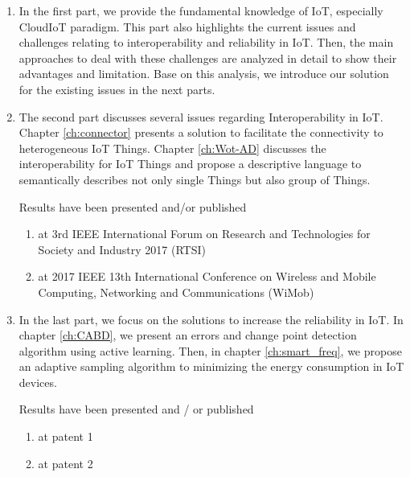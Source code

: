\begin{enumerate}
\item In the first part, we provide the fundamental knowledge of IoT, especially CloudIoT paradigm. This part also highlights the current issues and challenges relating to interoperability and reliability in IoT. Then, the main approaches to deal with these challenges are analyzed in detail to show their advantages and limitation. Base on this analysis, we introduce our solution for the existing issues in the next parts. 

\item The second part discusses several issues regarding Interoperability in IoT. Chapter \ref{ch:connector} presents a solution to facilitate the connectivity to heterogeneous IoT Things. Chapter \ref{ch:Wot-AD} discusses the interoperability for IoT Things and propose a  descriptive language to semantically describes not only single Things but also group of Things.

Results have been presented and/or published
\begin{enumerate}
\item at 3rd IEEE International Forum on Research and Technologies for Society and Industry 2017 (RTSI)~\cite{kim2017industrial}
\item  at 2017 IEEE 13th International Conference on Wireless and Mobile Computing, Networking and Communications (WiMob)~\cite{kim2017scalable}
\end{enumerate}

\item In the last part, we focus on the solutions to increase the reliability in IoT. In chapter \ref{ch:CABD}, we present an errors and change point detection algorithm using active learning. Then, in chapter \ref{ch:smart_freq}, we propose an adaptive sampling algorithm to minimizing the energy consumption in IoT devices.

Results have been presented and / or published
\begin{enumerate}
\item at patent 1
\item at patent 2
\end{enumerate}

\end{enumerate}
